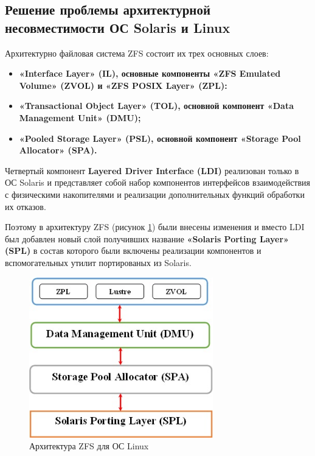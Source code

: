 \documentclass[10pt, a5paper]{article}
\begin{document}
\subsection*{Решение проблемы архитектурной несовместимости ОС Solaris и Linux}

Архитектурно файловая система ZFS состоит их трех основных слоев:

\begin{itemize}
  \item \textbf{«Interface Layer» (IL), основные компоненты «ZFS \linebreak Emulated Volume» (ZVOL) и «ZFS POSIX Layer» (ZPL):}
  \item \textbf{«Transactional Object Layer» (TOL), основной компонент «Data Management Unit» (DMU);}
  \item \textbf{«Pooled Storage Layer» (PSL), основной компонент \linebreak «Storage Pool Allocator» (SPA).}
\end{itemize}

Четвертый компонент \textbf{Layered Driver Interface (LDI)} реализован только в ОС Solaris и представляет собой набор компонентов интерфейсов взаимодействия с физическими накопителями и реализации дополнительных функций обработки их отказов.

Поэтому в архитектуру ZFS (рисунок \ref{xx:klyga:fig1}) были внесены изменения и вместо LDI был добавлен новый слой получивших название \textbf{«Solaris Porting Layer» (SPL)} в  состав которого были включены реализации компонентов и вспомогательных утилит портированых из Solaris.

\begin{center}
\begin{figure}[h!]
  \centering
  \includegraphics[width=8cm]{xx_klyga_arch_zfs}
  \caption{Архитектура ZFS для ОС Linux}
  \label{xx:klyga:fig1}
\end{figure}
\end{center}
\end{document}
